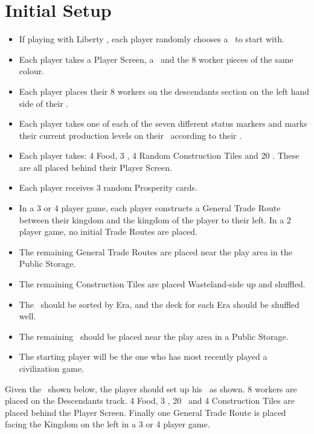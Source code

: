 \documentclass[10pt,twocolumn]{article}
\begin{document}
\section{Initial Setup}
\begin{itemize}
\item If playing with Liberty \baselands, each player randomly chooses a \baseland\ to start with.
\item Each player takes a Player Screen, a \psb\ and the 8 worker pieces of the same colour.
\item Each player places their 8 workers on the descendants section on the left hand side of their \psb.
\item Each player takes one of each of the seven different status markers and marks their current production levels on their \psb\ according to their \baseland.
\item Each player takes: 4 Food, 3 \money, 4 Random Construction Tiles and 20 \vps. These are all placed behind their Player Screen.
\item Each player receives 3 random Prosperity cards.
\item In a 3 or 4 player game, each player constructs a General Trade Route between their kingdom and the kingdom of the player to their left. In a 2 player game, no initial Trade Routes are placed.
\item The remaining General Trade Routes are placed near the play area in the Public Storage.
\item The remaining Construction Tiles are placed Wasteland-side up and shuffled.
\item The \landcards\ should be sorted by Era, and the deck for each Era should be shuffled well.
\item The remaining \goods\ should be placed near the play area in a Public Storage.
\item The starting player will be the one who has most recently played a civilization game.
\end{itemize}
\begin{BoxExample}Given the \baseland\ shown below, the player should set up his \psb\ as shown. 8 workers are placed on the Descendants track. 4 Food, 3 \money, 20 \vps\ and 4 Construction Tiles are placed behind the Player Screen. Finally one General Trade Route is placed facing the Kingdom on the left in a 3 or 4 player game.\end{BoxExample}
\end{document}
